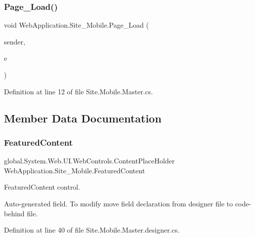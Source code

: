 \subsubsection{\texorpdfstring{Page\_Load()}{Page\_Load()}}
{\footnotesize\ttfamily void Web\+Application.\+Site\+\_\+\+Mobile.\+Page\+\_\+\+Load (\begin{DoxyParamCaption}\item[{object}]{sender,  }\item[{Event\+Args}]{e }\end{DoxyParamCaption})\hspace{0.3cm}{\ttfamily [protected]}}



Definition at line 12 of file Site.\+Mobile.\+Master.\+cs.



\subsection{Member Data Documentation}
\mbox{\label{classWebApplication_1_1Site__Mobile_a61a10c5df64029fe6271b69010a87f4d}} 
\subsubsection{\texorpdfstring{FeaturedContent}{FeaturedContent}}
{\footnotesize\ttfamily global.\+System.\+Web.\+U\+I.\+Web\+Controls.\+Content\+Place\+Holder Web\+Application.\+Site\+\_\+\+Mobile.\+Featured\+Content\hspace{0.3cm}{\ttfamily [protected]}}



Featured\+Content control. 

Auto-\/generated field. To modify move field declaration from designer file to code-\/behind file. 

Definition at line 40 of file Site.\+Mobile.\+Master.\+designer.\+cs.

\mbox{\label{classWebApplication_1_1Site__Mobile_a55b8e888061ac97b216ed6aee223f4bb}} 

